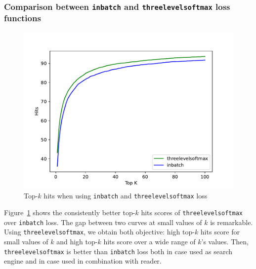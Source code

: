 \documentclass[12pt, sort&compress]{report}
\begin{document}
\subsubsection{Comparison between {\tt inbatch} and {\tt threelevelsoftmax} loss functions}
\label{sec:4.4.1.4}
\begin{figure}[!htbp]
	\centering
	\includegraphics[scale=.7]{images/PDF/experiments/inbatch_threelevelsoftmax_4-1-4.pdf}
	\caption{Top-$k$ hits when using {\tt inbatch} and {\tt threelevelsoftmax} loss}
	\label{fig:15}
\end{figure}
Figure~\ref{fig:15} shows the consistently better top-$k$ hits scores of {\tt threelevelsoftmax} over {\tt inbatch} loss. The gap between two curves at small values of $k$ is remarkable. Using {\tt threelevelsoftmax}, we obtain both objective: high top-$k$ hits score for small values of $k$ and high top-$k$ hits score over a wide range of $k$'s values. Then, {\tt threelevelsoftmax} is better than {\tt inbatch} loss both in case used as search engine and in case used in combination with reader.
\end{document}
